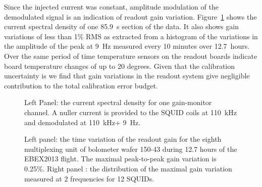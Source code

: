 \documentclass[../EBEXPaper2.tex]{subfiles}
\begin{document}
Since the injected current was constant, amplitude modulation of the demodulated signal is an indication of readout gain variation. 
Figure~\ref{fig:squidGain9Hz} shows the current spectral density of one 85.9~s section of the data. It also shows gain variations of less than 1\% RMS as extracted from a histogram of the variations in the amplitude of the peak at 9~Hz measured every 10 minutes over 12.7~hours.
Over the same period of time temperature sensors on the readout boards indicate board temperature changes of up to 20 degrees.
Given that the calibration uncertainty is  we find that gain variations in the readout system give negligible  contribution to the total calibration error budget.
\begin{figure}[htbp]
\begin{center}
\caption{Left Panel: the current spectral density for one gain-monitor channel. 
A nuller current is provided to the \ac{SQUID} coils at 110~kHz and demodulated at 110~kHz+ 9~Hz.
\label{fig:squidGain9Hz} }
\end{center}
\end{figure}

\begin{figure}[htbp]
\begin{center}
\caption{Left panel: the time variation of the readout gain for the eighth multiplexing unit of bolometer wafer 150-43 during 12.7 hours of the \ac{EBEX2013} flight.
The maximal peak-to-peak gain variation is 0.25\%.
Right panel : the distribution of the maximal gain variation measured at 2 frequencies for 12 \ac{SQUID}s.}
\label{fig:squidGainStability}
\end{center}
\end{figure}


%
\end{document}
